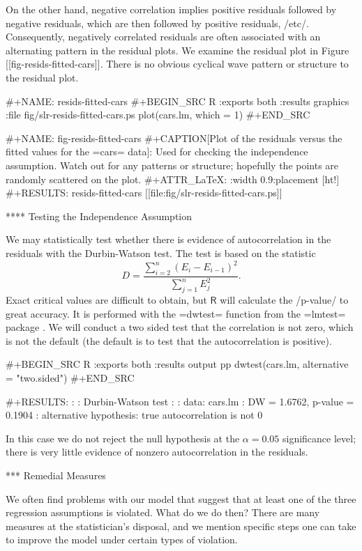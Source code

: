 On the other hand, negative correlation implies positive residuals
followed by negative residuals, which are then followed by positive
residuals, /etc/. Consequently, negatively correlated residuals are
often associated with an alternating pattern in the residual plots. We
examine the residual plot in Figure [[fig-resids-fitted-cars]]. There is no
obvious cyclical wave pattern or structure to the residual plot.

#+NAME: resids-fitted-cars
#+BEGIN_SRC R :exports both :results graphics :file fig/slr-resids-fitted-cars.ps
plot(cars.lm, which = 1)
#+END_SRC

#+NAME: fig-resids-fitted-cars
#+CAPTION[Plot of the residuals versus the fitted values for the =cars= data]: \small Used for checking the independence assumption. Watch out for any patterns or structure; hopefully the points are randomly scattered on the plot.
#+ATTR_LaTeX: :width 0.9\textwidth :placement [ht!]
#+RESULTS: resids-fitted-cars
[[file:fig/slr-resids-fitted-cars.ps]]

**** Testing the Independence Assumption

We may statistically test whether there is evidence of autocorrelation
in the residuals with the Durbin-Watson test. The test is based on the
statistic
\begin{equation}
D=\frac{\sum_{i=2}^{n}(E_{i}-E_{i-1})^{2}}{\sum_{j=1}^{n}E_{j}^{2}}.
\end{equation}
Exact critical values are difficult to obtain, but \(\mathsf{R}\) will
calculate the /p-value/ to great accuracy. It is performed with the
=dwtest= function from the =lmtest= package \cite{lmtest}. We will
conduct a two sided test that the correlation is not zero, which is
not the default (the default is to test that the autocorrelation is
positive).

#+BEGIN_SRC R :exports both :results output pp 
dwtest(cars.lm, alternative = "two.sided")
#+END_SRC

#+RESULTS:
: 
: 	Durbin-Watson test
: 
: data:  cars.lm
: DW = 1.6762, p-value = 0.1904
: alternative hypothesis: true autocorrelation is not 0

In this case we do not reject the null hypothesis at the
\(\alpha=0.05\) significance level; there is very little evidence of
nonzero autocorrelation in the residuals.

*** Remedial Measures

We often find problems with our model that suggest that at least one
of the three regression assumptions is violated. What do we do then?
There are many measures at the statistician's disposal, and we mention
specific steps one can take to improve the model under certain types
of violation.


